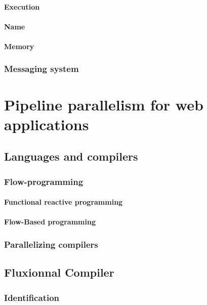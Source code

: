 \documentclass[12pt]{report}
\begin{document}
      \subsubsection{Execution}
      \subsubsection{Name}
      \subsubsection{Memory}
    \subsection{Messaging system}

\chapter{Pipeline parallelism for web applications}

  \section{Languages and compilers }
    \subsection{Flow-programming}
      \subsubsection{Functional reactive programming}
      \subsubsection{Flow-Based programming}
    \subsection{Parallelizing compilers}

  \section{Fluxionnal Compiler }
    \subsection{Identification}
\end{document}
